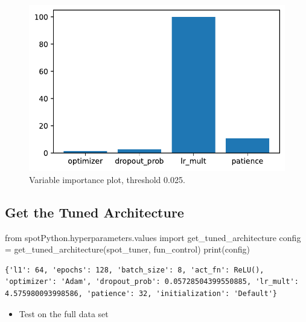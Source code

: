 \documentclass[
  letterpaper,
  DIV=11,
  numbers=noendperiod]{scrreprt}
\newenvironment{Shaded}{\begin{snugshade}}{\end{snugshade}}
\newcommand{\BuiltInTok}[1]{\textcolor[rgb]{0.00,0.23,0.31}{#1}}
\newcommand{\ImportTok}[1]{\textcolor[rgb]{0.00,0.46,0.62}{#1}}
\newcommand{\NormalTok}[1]{\textcolor[rgb]{0.00,0.23,0.31}{#1}}
\newcommand{\OperatorTok}[1]{\textcolor[rgb]{0.37,0.37,0.37}{#1}}
\providecommand{\tightlist}{%
  \setlength{\itemsep}{0pt}\setlength{\parskip}{0pt}}\usepackage{longtable,booktabs,array}
\begin{document}
\begin{figure}[H]

{\centering \includegraphics{032_spot_lightning_rnn_diabetes_files/figure-pdf/cell-17-output-1.pdf}

}

\caption{Variable importance plot, threshold 0.025.}

\end{figure}%

\subsection{Get the Tuned Architecture}\label{sec-get-spot-results-32}

\begin{Shaded}
\begin{Highlighting}[]
\ImportTok{from}\NormalTok{ spotPython.hyperparameters.values }\ImportTok{import}\NormalTok{ get\_tuned\_architecture}
\NormalTok{config }\OperatorTok{=}\NormalTok{ get\_tuned\_architecture(spot\_tuner, fun\_control)}
\BuiltInTok{print}\NormalTok{(config)}
\end{Highlighting}
\end{Shaded}

\begin{verbatim}
{'l1': 64, 'epochs': 128, 'batch_size': 8, 'act_fn': ReLU(), 'optimizer': 'Adam', 'dropout_prob': 0.05728504399550885, 'lr_mult': 4.575980093998586, 'patience': 32, 'initialization': 'Default'}
\end{verbatim}

\begin{itemize}
\tightlist
\item
  Test on the full data set
\end{itemize}
\end{document}
